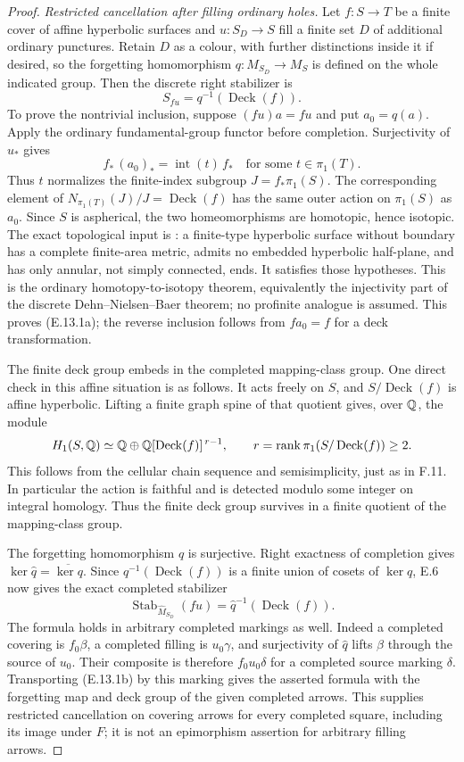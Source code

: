 \begin{proof}
\emph{Restricted cancellation after filling ordinary holes.}
Let $f:S\to T$ be a finite cover of affine hyperbolic surfaces and
$u:S_D\to S$ fill a finite set $D$ of additional ordinary punctures.
Retain $D$ as a colour, with further distinctions inside it if desired,
so the forgetting homomorphism $q:M_{S_D}\to M_S$ is defined on the
whole indicated group. Then the discrete right stabilizer is
\[
                    S_{fu}=q^{-1}(\operatorname{Deck}(f)).     \tag{E.13.1a}
\]
To prove the nontrivial inclusion, suppose $(fu)a=fu$ and put
$a_0=q(a)$. Apply the ordinary fundamental-group functor before
completion. Surjectivity of $u_*$ gives
\[
 f_*\,(a_0)_*=\operatorname{int}(t)\,f_*
                       \quad\text{for some }t\in\pi_1(T).
\]
Thus $t$ normalizes the finite-index subgroup
$J=f_*\pi_1(S)$. The corresponding element of
$N_{\pi_1(T)}(J)/J=\operatorname{Deck}(f)$ has the same outer action
on $\pi_1(S)$ as $a_0$. Since $S$ is aspherical, the two
homeomorphisms are homotopic, hence isotopic. The exact topological
input is \citet[Theorem 5.6(1); Corollary 5.7]{E_CantwellConlon2014}:
a finite-type hyperbolic surface without boundary has a complete
finite-area metric, admits no embedded hyperbolic half-plane, and has
only annular, not simply connected, ends. It satisfies those hypotheses.
This is the ordinary homotopy-to-isotopy theorem, equivalently the
injectivity part of the discrete Dehn--Nielsen--Baer theorem; no
profinite analogue is assumed. This proves (E.13.1a); the reverse
inclusion follows from $f a_0=f$ for a deck transformation.

The finite deck group embeds in the completed mapping-class group.
One direct check in this affine situation is as follows. It acts freely
on $S$, and $S/\operatorname{Deck}(f)$ is affine hyperbolic. Lifting
a finite graph spine of that quotient gives, over $\mathbb Q$, the module
\[
 H_1(S,\mathbb Q)\simeq\mathbb Q\oplus
 \mathbb Q[\operatorname{Deck}(f)]^{\,r-1},\qquad
 r=\operatorname{rank}\pi_1(S/\operatorname{Deck}(f))\ge2.
\]
This follows from the cellular chain sequence and semisimplicity, just
as in F.11. In particular the action is faithful and is detected modulo
some integer on integral homology. Thus the finite deck group survives
in a finite quotient of the mapping-class group.

The forgetting homomorphism $q$ is surjective. Right exactness of
completion gives $\ker\widehat q=\overline{\ker q}$. Since
$q^{-1}(\operatorname{Deck}(f))$ is a finite union of cosets of
$\ker q$, E.6 now gives the exact completed stabilizer
\[
 \operatorname{Stab}_{\widehat M_{S_D}}(fu)
       =\widehat q^{-1}(\operatorname{Deck}(f)).                \tag{E.13.1b}
\]
The formula holds in arbitrary completed markings as well. Indeed a
completed covering is $f_0\beta$, a completed filling is $u_0\gamma$,
and surjectivity of $\widehat q$ lifts $\beta$ through the source of
$u_0$. Their composite is therefore $f_0u_0\delta$ for a completed
source marking $\delta$. Transporting (E.13.1b) by this marking gives
the asserted formula with the forgetting map and deck group of the
given completed arrows. This supplies restricted cancellation on
covering arrows for every completed square, including its image under
$F$; it is not an epimorphism assertion for arbitrary filling arrows.


\end{proof}
